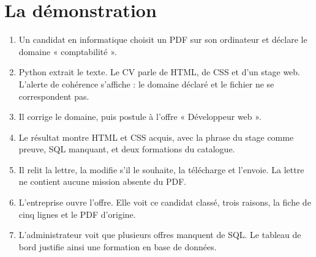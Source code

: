 \documentclass[11pt,a4paper]{article}
\begin{document}
\section{La démonstration}

\begin{enumerate}
  \item Un candidat en informatique choisit un PDF sur son ordinateur et déclare le domaine « comptabilité ».
  \item Python extrait le texte. Le CV parle de HTML, de CSS et d'un stage web. L'alerte de cohérence s'affiche : le domaine déclaré et le fichier ne se correspondent pas.
  \item Il corrige le domaine, puis postule à l'offre « Développeur web ».
  \item Le résultat montre HTML et CSS acquis, avec la phrase du stage comme preuve, SQL manquant, et deux formations du catalogue.
  \item Il relit la lettre, la modifie s'il le souhaite, la télécharge et l'envoie. La lettre ne contient aucune mission absente du PDF.
  \item L'entreprise ouvre l'offre. Elle voit ce candidat classé, trois raisons, la fiche de cinq lignes et le PDF d'origine.
  \item L'administrateur voit que plusieurs offres manquent de SQL. Le tableau de bord justifie ainsi une formation en base de données.
\end{enumerate}
\end{document}
